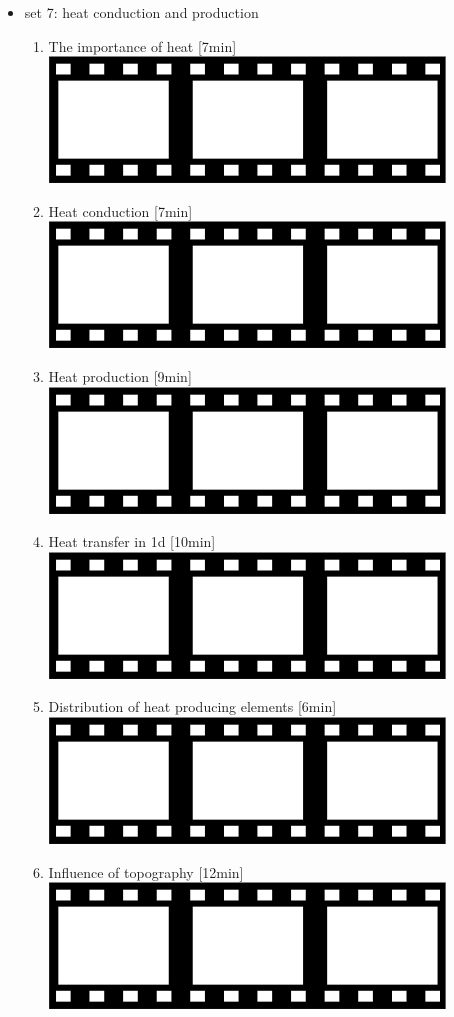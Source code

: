 \begin{itemize}
\item set 7: heat conduction and production
\begin{enumerate}
\item The importance of heat [7min] 
      \href{https://youtu.be/g_nJqRJWMKw?si=m7GfZ0B7SSIaArEZ}{\includegraphics[width=.8cm]{images/pictograms/film.png}}
\item Heat conduction [7min] 
      \href{https://youtu.be/H15N4ntkyHQ?si=6ZcDrL84so4cOTWV}{\includegraphics[width=.8cm]{images/pictograms/film.png}}
\item Heat production [9min] 
      \href{https://youtu.be/3Lxw-Qso34w?si=ev_U6aI15WZzsgPp}{\includegraphics[width=.8cm]{images/pictograms/film.png}}
\item Heat transfer in 1d [10min] 
      \href{https://youtu.be/oM1WIV1V1W0?si=JlM6HZdkJ6wlyV79}{\includegraphics[width=.8cm]{images/pictograms/film.png}}
\item Distribution of heat producing elements [6min] 
      \href{https://youtu.be/HSfEyhxx66M?si=Kfefh0LefDIkFdvn}{\includegraphics[width=.8cm]{images/pictograms/film.png}}
\item Influence of topography [12min] 
      \href{https://youtu.be/JhVV_cBJetE?si=9SJAzjhlCeyXQMGq}{\includegraphics[width=.8cm]{images/pictograms/film.png}}
\end{enumerate}


\end{itemize}
